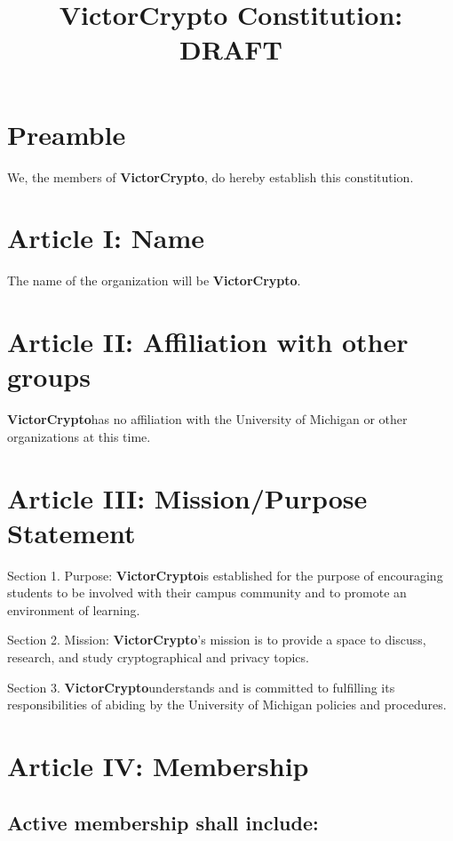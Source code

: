 \documentclass[11pt]{article}
\title{\textbf{VictorCrypto Constitution: DRAFT}}
\newcommand{\orgname}{\textbf{VictorCrypto}}
\begin{document}
    \maketitle


    \section{Preamble}
    We, the members of \orgname, do hereby establish this constitution.


    \section{Article I: Name}

    The name of the organization will be \orgname.


    \section{Article II: Affiliation with other groups}

    \orgname has no affiliation with the University of Michigan or other organizations at this time.


    \section{Article III: Mission/Purpose Statement}

    Section 1. Purpose: \orgname is established for the purpose of encouraging students to be involved with their
    campus community and to promote an environment of learning.

    Section 2. Mission: \orgname 's mission is to provide a space to discuss, research, and study cryptographical and privacy topics.

    Section 3. \orgname understands and is committed to fulfilling its responsibilities of abiding by the University
    of Michigan policies and procedures.



    \section{Article IV: Membership}

    \subsection{Active membership shall include:}
\end{document}
